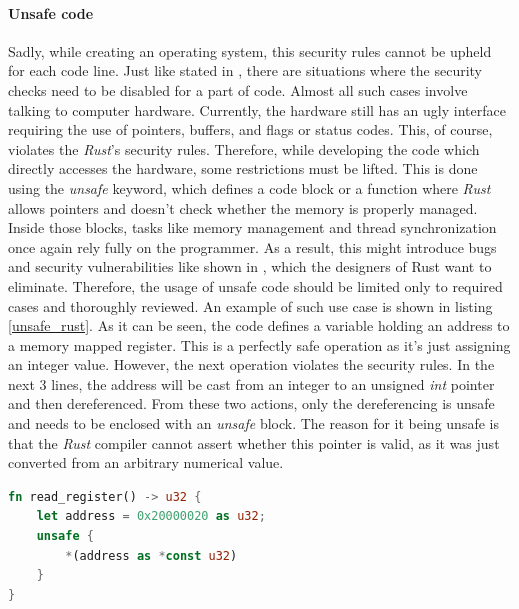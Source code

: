 \paragraph{Unsafe code}
Sadly, while creating an operating system, this security rules cannot be upheld for each code line. Just like stated in \cite{rusthowunsafe}, there are situations where the security checks need to be disabled for a part of code. Almost all such cases involve talking to computer hardware. Currently, the hardware still has an ugly interface requiring the use of pointers, buffers, and flags or status codes. This, of course, violates the \textit{Rust}'s security rules. Therefore, while developing the code which directly accesses the hardware, some restrictions must be lifted. This is done using the \textit{unsafe} keyword, which defines a code block or a function where \textit{Rust} allows pointers and doesn't check whether the memory is properly managed. Inside those blocks, tasks like memory management and thread synchronization once again rely fully on the programmer. As a result, this might introduce bugs and security vulnerabilities like shown in \cite{rustunsafeissues}, which the designers of Rust want to eliminate. Therefore, the usage of unsafe code should be limited only to required cases and thoroughly reviewed. An example of such use case is shown in listing \ref{unsafe_rust}. As it can be seen, the code defines a variable holding an address to a memory mapped register. This is a perfectly safe operation as it's just assigning an integer value. However, the next operation violates the security rules. In the next 3 lines, the address will be cast from an integer to an unsigned \textit{int} pointer and then dereferenced. From these two actions, only the dereferencing is unsafe and needs to be enclosed with an \textit{unsafe} block. The reason for it being unsafe is that the \textit{Rust} compiler cannot assert whether this pointer is valid, as it was just converted from an arbitrary numerical value. 

\begin{minipage}{.9\textwidth}
    \begin{lstlisting}[language=rust,caption={Unsafe code exmaple},captionpos=b,label={unsafe_rust}]
fn read_register() -> u32 {
    let address = 0x20000020 as u32;
    unsafe {
        *(address as *const u32)
    }
}        
    \end{lstlisting}    
\end{minipage}

